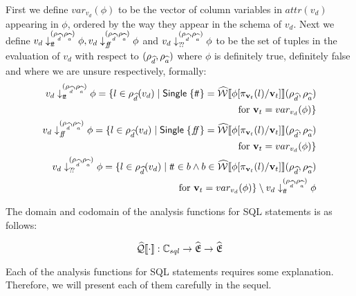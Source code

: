First we define $var_{v_d}(\phi)$ to be the vector of column variables in $attr(v_d)$ appearing in $\phi$, ordered by the way they appear in the schema of $v_d$.
Next we define $v_d \downarrow_{t\!t}^{(\rho_{\widehat{d}}, \rho_{\widehat{a}})} \phi, v_d \downarrow_{f\!\!f}^{(\rho_{\widehat{d}}, \rho_{\widehat{a}})} \phi$ and  $v_d \downarrow_{?\!?}^{(\rho_{\widehat{d}}, \rho_{\widehat{a}})} \phi$ to be the set of tuples in the evaluation of $v_d$ with respect to $(\rho_{\widehat{d}}, \rho_{\widehat{a}})$ where $\phi$ is definitely true, definitely false and where we are unsure respectively, formally:
\begin{align}
    \begin{split}
        v_d \downarrow_{\true}^{(\rho_{\ab{d}}, \rho_{\ab{a}})} \phi = \{ l \in \rho_{\ab{d}}(v_d) \mid \mathsf{Single} \; \{ \true \} = \abspredsem{\phi[\pi_{\mathbf{v}_t}(l)/\mathbf{v}_t]}(\rho_{\ab{d}}, \rho_{\ab{a}}) \\
        \text{ for } \mathbf{v}_t = var_{v_d}(\phi) \}
    \end{split}\\
    \begin{split}
        v_d \downarrow_{\false}^{(\rho_{\ab{d}}, \rho_{\ab{a}})} \phi = \{ l \in \rho_{\ab{d}}(v_d) \mid \mathsf{Single} \; \{ \false \} = \abspredsem{\phi[\pi_{\mathbf{v}_t}(l)/\mathbf{v}_t]}(\rho_{\ab{d}}, \rho_{\ab{a}}) \\
        \text{ for } \mathbf{v}_t = var_{v_d}(\phi) \}
    \end{split}\\
    \begin{split}
        v_d \downarrow_{\unknown}^{(\rho_{\ab{d}}, \rho_{\ab{a}})} \phi = \{ l \in \rho_{\ab{d}}(v_d) \mid \true \in b \land b \in \abspredsem{\phi[\pi_{\mathbf{v}_t}(l)/\mathbf{v}_t]}(\rho_{\ab{d}}, \rho_{\ab{a}}) \\
        \text{ for } \mathbf{v}_t = var_{v_d}(\phi) \} \setminus v_d \downarrow_{\true}^{(\rho_{\ab{d}}, \rho_{\ab{a}})} \phi
    \end{split}
\end{align}

The domain and codomain of the analysis functions for SQL statements is as follows:

\begin{equation}
    \widehat{\mathcal{Q}}\llbracket \cdot \rrbracket : \mathbb{C}_{sql} \rightarrow \widehat{\mathfrak{E}} \rightarrow \widehat{\mathfrak{E}}
\end{equation}

Each of the analysis functions for SQL statements requires some explanation.
Therefore, we will present each of them carefully in the sequel.

